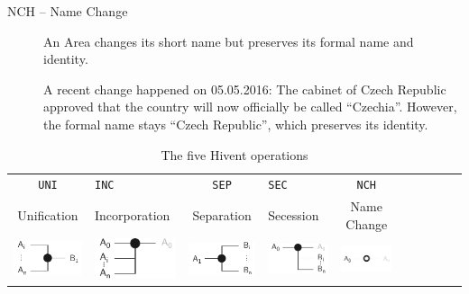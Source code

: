 \begin{description}
  \item[NCH -- Name Change]
  An Area changes its short name but preserves its formal name and identity. \\[0.25em]
  \begin{footnotesize}
    A recent change happened on 05.05.2016: The cabinet of Czech Republic approved that the country will now officially be called ``Czechia''. However, the formal name stays ``Czech Republic'', which preserves its identity.
  \end{footnotesize}
\end{description}

\vspace{1.5em}
\begin{table}[H]
\begin{center}
\begin{tabular}{cx{2.5cm} cx{2.5cm} cx{2.5cm} cx{2.5cm} cx{2.5cm}}

  \texttt{UNI} & \texttt{INC} & \texttt{SEP} & \texttt{SEC} & \texttt{NCH} \\
  Unification & Incorporation & Separation & Secession & Name Change \\[1em]

  \includegraphics{graphics/development/hivent_model/operations/UNI} &
  \includegraphics{graphics/development/hivent_model/operations/INC} &
  \includegraphics{graphics/development/hivent_model/operations/SEP} &
  \includegraphics{graphics/development/hivent_model/operations/SEC} &
  \includegraphics{graphics/development/hivent_model/operations/NCH} \\

\end{tabular}
\caption{The five Hivent operations}
\label{tab:hivent_operations}
\end{center}
\end{table}

